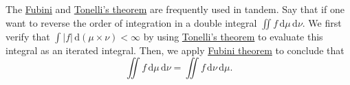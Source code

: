 \begin{remark}
	The \hyperref[thm:Fubini]{Fubini} and \hyperref[thm:Tonelli]{Tonelli's theorem} are frequently used in tandem. Say that if one want to reverse the order of integration in a double integral \(\iint f \,\mathrm{d} \mu \,\mathrm{d} \nu \). We first verify that \(\int \left\vert f \right\vert \,\mathrm{d} (\mu \times \nu ) < \infty \) by using \hyperref[thm:Tonelli]{Tonelli's theorem} to evaluate this integral as an iterated integral. Then, we apply \hyperref[thm:Fubini]{Fubini theorem} to conclude that
	\[
		\iint f \,\mathrm{d} \mu \,\mathrm{d} \nu = \iint f \,\mathrm{d} \nu \,\mathrm{d} \mu.
	\]
\end{remark}
